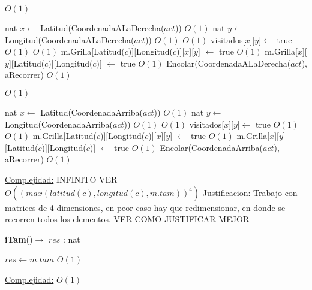 \begin{Algoritmos}
\begin{algorithmic}[1]
\State $ $


      \Comment $O(1)$

\State nat $x \gets$ Latitud(CoordenadaALaDerecha($act$))   \Comment $O(1)$
\State nat $y \gets$ Longitud(CoordenadaALaDerecha($act$))  \Comment $O(1)$
    \Comment $O(1)$
\State visitados[$x$][$y$]$ \gets$ true    \Comment $O(1)$
	 	\Comment $O(1)$
		\State m.Grilla[Latitud($c$)][Longitud($c$)][$x$][$y$] $ \gets $ true \Comment $O(1)$
		\State m.Grilla[$x$][$y$][Latitud($c$)][Longitud($c$)] $ \gets $ true \Comment $O(1)$
		\State Encolar(CoordenadaALaDerecha($act$), aRecorrer) \Comment $O(1)$	
	\EndIf
\EndIf
\EndIf
\State $ $

      \Comment $O(1)$

\State nat $x \gets$ Latitud(CoordenadaArriba($act$))   \Comment $O(1)$
\State nat $y \gets$ Longitud(CoordenadaArriba($act$))  \Comment $O(1)$
    \Comment $O(1)$
\State visitados[$x$][$y$]$ \gets$ true    \Comment $O(1)$
	 	\Comment $O(1)$
		\State m.Grilla[Latitud($c$)][Longitud($c$)][$x$][$y$] $ \gets $ true \Comment $O(1)$
		\State m.Grilla[$x$][$y$][Latitud($c$)][Longitud($c$)] $ \gets $ true \Comment $O(1)$
		\State Encolar(CoordenadaArriba($act$), aRecorrer) \Comment $O(1)$	
	\EndIf
\EndIf
\EndIf

\EndWhile

\medskip
\Statex \underline{Complejidad:} INFINITO VER$O((max(latitud(c), longitud(c), m.tam))^4)$
\Statex \underline{Justificacion:} Trabajo con matrices de 4 dimensiones, en peor caso hay que redimensionar, en donde se recorren todos los elementos. VER COMO JUSTIFICAR MEJOR


\end{algorithmic}



\begin{algorithm}[H]
{\textbf{iTam}()$\to$ $res$ : nat}
\begin{algorithmic}[1]

\State $res \gets m.tam$ \Comment $O(1)$

\medskip
\Statex \underline{Complejidad:} $O(1)$

\end{algorithmic}
\end{algorithm}


  
\end{Algoritmos}